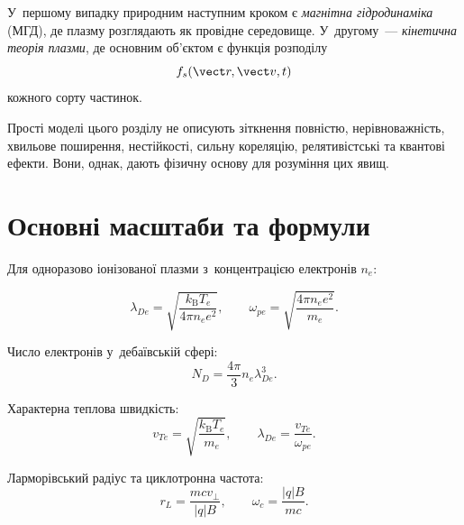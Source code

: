 У~першому випадку природним наступним кроком є \emph{магнітна гідродинаміка} (МГД), де плазму розглядають як провідне середовище. У~другому~--- \emph{кінетична теорія плазми}, де основним об'єктом є функція розподілу
\begin{equation*}
	f_s(\vect r,\vect v,t)
\end{equation*}
кожного сорту частинок.

Прості моделі цього розділу не описують зіткнення повністю, нерівноважність, хвильове поширення, нестійкості, сильну кореляцію, релятивістські та квантові ефекти. Вони, однак, дають фізичну основу для розуміння цих явищ.



\section{Основні масштаби та формули}



Для одноразово іонізованої плазми з~концентрацією електронів $n_e$:

\begin{equation}
	\lambda_{De}
	=\sqrt{\frac{k_{\mathrm B}T_e}{4\pi n_e e^2}},
	\qquad
	\omega_{pe}
	=\sqrt{\frac{4\pi n_e e^2}{m_e}}.
\end{equation}

Число електронів у~дебаївській сфері:
\begin{equation}
	N_D=\frac{4\pi}{3}n_e\lambda_{De}^3.
\end{equation}

Характерна теплова швидкість:
\begin{equation}
	v_{Te}=\sqrt{\frac{k_{\mathrm B}T_e}{m_e}},
	\qquad
	\lambda_{De}=\frac{v_{Te}}{\omega_{pe}}.
\end{equation}

Ларморівський радіус та циклотронна частота:
\begin{equation}
	r_L=\frac{mc v_\perp}{|q|B},
	\qquad
	\omega_c=\frac{|q|B}{mc}.
\end{equation}

